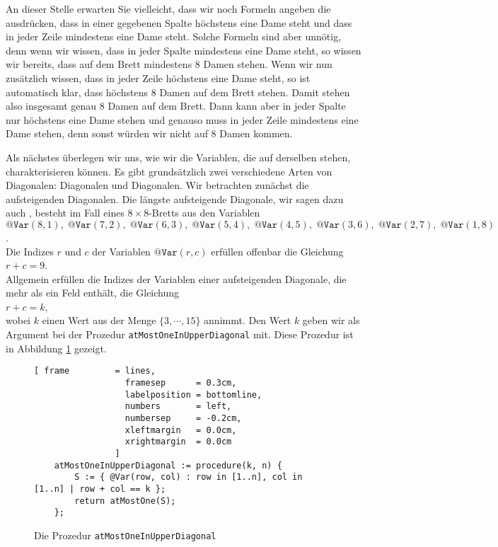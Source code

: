 An dieser Stelle erwarten Sie vielleicht, dass wir noch Formeln angeben die
ausdrücken, dass in einer gegebenen Spalte höchstens eine Dame steht und dass in jeder
Zeile mindestens eine Dame steht.
Solche Formeln sind aber unnötig, denn wenn wir wissen, dass in jeder Spalte mindestens
eine Dame steht, so wissen wir bereits, dass auf dem Brett mindestens 8 Damen stehen.
Wenn wir nun zusätzlich wissen, dass in jeder Zeile höchstens eine Dame steht, so ist
automatisch klar, dass höchstens 8 Damen auf dem Brett stehen.  Damit stehen also insgesamt genau
8 Damen auf dem Brett.  Dann kann aber in jeder Spalte nur höchstens eine Dame stehen und genauso muss
in jeder Zeile mindestens eine Dame stehen, denn sonst würden wir nicht auf 8 Damen kommen.


Als nächstes überlegen wir uns, wie wir die Variablen, die auf derselben 
stehen, charakterisieren können.  Es gibt grundsätzlich zwei verschiedene Arten von
Diagonalen:  Diagonalen und  Diagonalen.  Wir betrachten zunächst
die aufsteigenden Diagonalen.  Die längste aufsteigende Diagonale, wir sagen dazu auch
, besteht im Fall eines $8 \times 8$-Bretts aus den
Variablen \\[0.2cm]
\hspace*{1.3cm} 
$\texttt{@Var}(8,1),\; \texttt{@Var}(7,2),\; \texttt{@Var}(6,3),\; \texttt{@Var}(5,4),\; \texttt{@Var}(4,5),\; \texttt{@Var}(3,6),\; 
 \texttt{@Var}(2,7),\; \texttt{@Var}(1,8)$. 
\\[0.2cm]
Die Indizes $r$ und $c$ der Variablen $\texttt{@Var}(r,c)$ erfüllen offenbar
die Gleichung \\[0.2cm]
\hspace*{1.3cm} $r + c = 9$. \\[0.2cm]
Allgemein erfüllen die Indizes der Variablen einer aufsteigenden Diagonale, die mehr als ein Feld enthält, die
Gleichung \\[0.2cm] 
\hspace*{1.3cm} $r + c = k$, \\[0.2cm]
wobei $k$ einen Wert aus der Menge $\{3, \cdots, 15 \}$ annimmt.  Den Wert $k$ geben wir als Argument bei der
Prozedur \texttt{atMostOneInUpperDiagonal} mit.  Diese Prozedur ist in Abbildung
\ref{fig:atMostOneInUpperDiagonal} gezeigt. 

\begin{figure}[!ht]
  \centering
\begin{Verbatim}[ frame         = lines, 
                  framesep      = 0.3cm, 
                  labelposition = bottomline,
                  numbers       = left,
                  numbersep     = -0.2cm,
                  xleftmargin   = 0.0cm,
                  xrightmargin  = 0.0cm
                ]
    atMostOneInUpperDiagonal := procedure(k, n) {
        S := { @Var(row, col) : row in [1..n], col in [1..n] | row + col == k };
        return atMostOne(S);
    };
\end{Verbatim}
\vspace*{-0.3cm}
  \caption{Die Prozedur \texttt{atMostOneInUpperDiagonal}}
  \label{fig:atMostOneInUpperDiagonal}
\end{figure}

